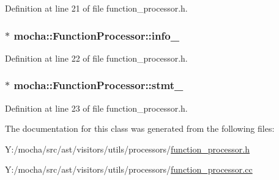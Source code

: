 Definition at line 21 of file function\_\-processor.h.

\hypertarget{classmocha_1_1_function_processor_a6f7c00d60191f92a3bdb359c7031eedb}{
\subsubsection[{info\_\-}]{$\ast$ {\bf mocha::FunctionProcessor::info\_\-}}}
\label{classmocha_1_1_function_processor_a6f7c00d60191f92a3bdb359c7031eedb}


Definition at line 22 of file function\_\-processor.h.

\hypertarget{classmocha_1_1_function_processor_ab5123d2edc85be3e181a79dd7714ba7a}{
\subsubsection[{stmt\_\-}]{$\ast$ {\bf mocha::FunctionProcessor::stmt\_\-}}}
\label{classmocha_1_1_function_processor_ab5123d2edc85be3e181a79dd7714ba7a}


Definition at line 23 of file function\_\-processor.h.



The documentation for this class was generated from the following files:\begin{DoxyCompactItemize}
\item 
Y:/mocha/src/ast/visitors/utils/processors/\hyperlink{function__processor_8h}{function\_\-processor.h}\item 
Y:/mocha/src/ast/visitors/utils/processors/\hyperlink{function__processor_8cc}{function\_\-processor.cc}\end{DoxyCompactItemize}
